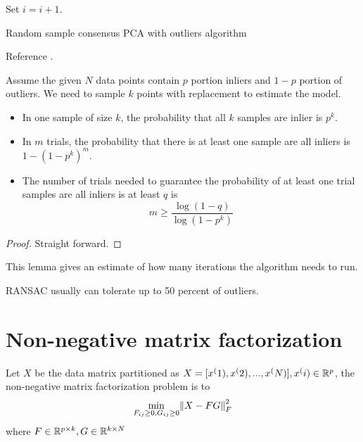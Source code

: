 \begin{refsection}
\begin{algorithm}[H]
{		Set $i=i+1.$\\
	}
	\caption{Random sample consensus PCA with outliers algorithm}
\end{algorithm}

\begin{remark}
	Reference \cite[107]{vidal2016generalized}.
\end{remark}

\begin{lemma}\cite[508]{vidal2016generalized}
Assume the given $N$ data points contain $p$ portion inliers and $1-p$ portion of outliers. We need to sample $k$ points with replacement to estimate the model.
\begin{itemize}
	\item In one sample of size $k$, the probability that all $k$ samples are inlier is $p^k$.
	\item In $m$ trials, the probability that there is at least one sample are all inliers is $1 - (1 - p^k)^m$.
	\item The number of trials needed to guarantee the probability of at least one trial samples are all inliers is at least $q$ is
	$$m\geq \frac{\log(1-q)}{\log(1-p^k)}$$
\end{itemize}
\end{lemma}
\begin{proof}
Straight forward.
\end{proof}

\begin{remark}[interpretation]
This lemma gives an estimate of how many iterations the algorithm needs to run.
\end{remark}

\begin{remark}
RANSAC usually can tolerate up to 50 percent of outliers.
\end{remark}


\section{Non-negative matrix factorization}

\begin{definition}\cite{lee1999learning}
Let $X$ be the data matrix partitioned as $X=[x^(1),x^(2),...,x^(N)],x^(i)\in \mathbb{R}^p$, the non-negative matrix factorization problem is to 
$$\min_{F_{ij}\geq 0, G_{ij}\geq 0} \norm{X-FG}^2_F$$
where $F\in \mathbb{R}^{p\times k}, G\in \mathbb{R}^{k\times N}$
\end{definition}


\end{refsection}
